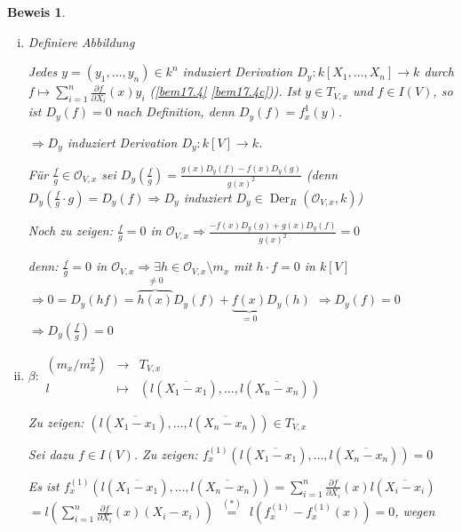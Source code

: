 \documentclass[a4paper, 12pt, numbers=noendperiod, chapterprefix=true]{scrbook}
\theoremstyle{break}
\theoremstyle{nonumberbreak}
\newtheorem{Bew}{Beweis}
\theoremstyle{nonumberplain}
\newcommand{\Sum}{\sum\limits}
\DeclareMathOperator{\Der}{Der}
\newcommand{\calO}{\mathcal{O}}
\newcommand{\FakRaum}[2]{
  \raisebox{0.7ex}{\ensuremath{#1}}
  \ensuremath{\mkern-3mu}\big/\ensuremath{\mkern-3mu}
  \raisebox{-0.6ex}{\ensuremath{#2}}}
\begin{document}
\begin{Bew}\begin{enumerate}[i)]
\item
	Definiere Abbildung\\ 
	\begin{center}\end{center}
	Jedes $y=(y_1,\ldots ,y_n)\in k^n$ induziert Derivation $D_y:k[X_1,\ldots ,X_n]\to k$ durch $f\mapsto\sum	\limits_{i=1}^n\frac{\partial f}{\partial X_i}(x)y_i$ (\ref{bem17.4} \ref{bem17.4c})). Ist $y \in T_{V,x}$ und $f\in I(V)$, so ist $D_y(f)=0$ nach Definition, denn $D_y(f)=f_x^1(y)$.
	
	$\Rightarrow D_y$ induziert Derivation $D_y:k[V]\to k$.
	
	F\"ur $\frac{f}{g}\in \calO_{V,x}$ sei $D_y(\frac{f}{g})=\frac{g(x)D_y(f)-f(x)D_y(g)}{g(x)^2}$ (denn $D_y(\frac{f}{g}\cdot g)=D_y(f) \Rightarrow D_y$ induziert $D_y\in \Der_R(\calO_{V,x},k)$)
	
	\emph{Noch zu zeigen:} $\frac{f}{g}=0$ in $\calO_{V,x}\Rightarrow \frac{-f(x)D_y(g)+g(x)D_y(f)}{g(x)^2}=0$
	
	\emph{denn:} $\frac{f}{g}=0$ in $\calO_{V,x} \Rightarrow \exists h\in \calO_{V,x}\setminus m_x$ mit $h\cdot f=0$ in $k[V]$ $\Rightarrow 0=D_y(hf)=\overbrace{h(x)}^{\ne0}D_y(f)+\underbrace{f(x)}_{=0}D_y(h)$ $\Rightarrow D_y(f)=0$ $\Rightarrow D_y(\frac{f}{g})=0$
\item
	$ \beta:\begin{array}{rcl}(m_x/m_x^2) &\to& T_{V,x}\\
	l &\mapsto& \left(l(\overline{X_1-x_1}),\ldots ,l(\overline{X_n-x_n})\right)\end{array}$
	
	\emph{Zu zeigen:} $\left(l(\overline{X_1-x_1}),\ldots ,l(\overline{X_n-x_n})\right) \in T_{V,x}$
	
	Sei dazu $f\in I(V)$. \emph{Zu zeigen:} $f_x^{(1)}\left(l(\overline{X_1-x_1}),\ldots ,l(\overline{X_n-x_n})\right)=0$
	
	Es ist $f_x^{(1)}\left(l(\overline{X_1-x_1}),\ldots ,l(\overline{X_n-x_n})\right)= \Sum_{i=1}^n \frac{\partial f}{\partial X_i}(x)l(\overline{X_i-x_i})$ $= l\left(\Sum_{i=1}^n \frac{\partial f}{\partial X_i}(x)(X_i-x_i)\right)$ $\overset{(*)}{=}$ $l\left( f_x^{(1)}-f_x^{(1)}(x) \right) = 0$, wegen
	

\end{enumerate}
\end{Bew}
\end{document}

